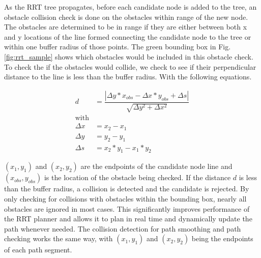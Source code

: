 \documentclass[letterpaper, 10 pt, conference]{ieeeconf}  %
\newcommand{\todo}[1]{{\color{blue}[TODO: #1]}}
\begin{document}
As the RRT tree propagates, before each candidate node is added to the tree, an obstacle collision check is done on the obstacles within range of the new node. The obstacles are determined to be in range if they are either between both x and y locations of the line formed connecting the candidate node to the tree or within one buffer radius of those points. The green bounding box in Fig. \ref{fig:rrt_sample} shows which obstacles would be included in this obstacle check. To check the if the obstacles would collide, we check to see if their perpendicular distance to the line is less than the buffer radius. With the following equations.

\begin{align}
  d &= \dfrac{|\Delta y*x_{\mathit{obs}} -
      \Delta x*y_{\mathit{obs}} + \Delta s|}
      {\sqrt{\Delta y^2 + \Delta x^2}}\\
  \nonumber \text{with}\\
  \Delta x &= x_2 - x_1\\
  \Delta y &= y_2 - y_1\\
  \Delta s &= x_2*y_1 -x_1*y_2
\end{align}

$(x_1,y_1)$ and $(x_2,y_2)$ are the endpoints of the candidate node line and $(x_{\mathit{obs}},y_{\mathit{obs}})$ is the location of the obstacle being checked. If the distance $d$ is less than the buffer radius, a collision is detected and the candidate is rejected. By only checking for collisions with obstacles within the bounding box, nearly all obstacles are ignored in most cases. This significantly improves performance of the RRT planner and allows it to plan in real time and dynamically update the path whenever needed. The collision detection for path smoothing and path checking works the same way, with $(x_1,y_1)$ and $(x_2,y_2)$ being the endpoints of each path segment.

%
%
%
%
\end{document}
